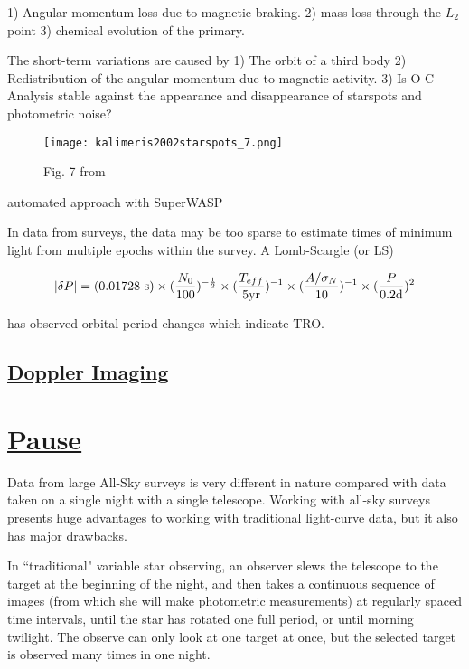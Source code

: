 \documentclass[12pt]{article} %
\numberwithin{equation}{section} %
\begin{document}
1) Angular momentum loss due to magnetic braking.
2) mass loss through the $L_{2}$ point 
3) chemical evolution of the primary.

The short-term variations are caused by
1) The orbit of a third body
2) Redistribution of the angular momentum due to magnetic activity.
3) 
Is O-C Analysis stable against the appearance and disappearance of starspots and photometric noise? \citep{kalimeris2002starspots}

\begin{figure}[H]
\centering
\texttt{[image: kalimeris2002starspots\_7.png]}
\caption{ Fig. 7 from \citet{kalimeris2002starspots}}
\label{fig: kalimeris2002starspots_7}
\end{figure}

automated approach with SuperWASP \citep{lohr2015orbital}

In data from surveys, the data may be too sparse to estimate times of minimum light from multiple epochs within the survey. A Lomb-Scargle (or LS) \citep{scargle1982studies}

\citep{horne1986prescription} 

\begin{equation} \label{eqn: horne_baliunas}
|\delta P| = (0.01728\text{ s}) \times (\frac{N_{0}}{100})^{-\frac{1}{2}} \times (\frac{T_{eff}}{5\text{yr}})^{-1} \\  \times (\frac{A/ \sigma_{N}}{10})^{-1} \times (\frac{P}{0.2\text{d}})^{2}
\end{equation}


\citet{qian2001orbital} has observed orbital period changes which indicate TRO. 

\subsection[Doppler Imaging]{\hyperlink{toc}{Doppler Imaging}} \label{sec: doppler_imaging}

\section[Pause]{\hyperlink{toc}{Pause}} \label{sec: pause}

Data from large All-Sky surveys is very different in nature compared with data taken on a single night with a single telescope. Working with all-sky surveys presents huge advantages to working with traditional light-curve data, but it also has major drawbacks.

In ``traditional" variable star observing, an observer slews the telescope to the target at the beginning of the night, and then takes a continuous sequence of images (from which she will make photometric measurements) at regularly spaced time intervals, until the star has rotated one full period, or until morning twilight. The observe can only look at one target at once, but the selected target is observed many times in one night.
\end{document}
